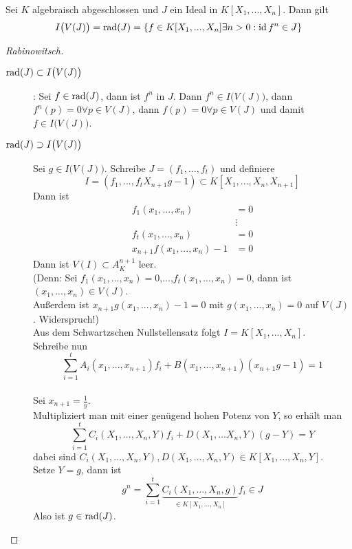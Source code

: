 	\begin{theorem}
		Sei $K$ algebraisch abgeschlossen und $J$ ein Ideal in $K[X_1,...,X_n]$. Dann gilt
		\[I\big(V(J)\big)=\operatorname{rad}(J)=\{f\in K[X_1,...,X_n]\exists n>0:\operatorname{id} f^n\in J\}\]
	\end{theorem}
	\begin{proof}[Rabinowitsch]
		\begin{description}
			\item[$\operatorname{rad}(J)\subset I\big(V(J)\big)$]: Sei $f\in \operatorname{rad}(J)$, dann ist $f^n$ in $J$. Dann $f^n\in I\big(V(J)\big)$, dann $f^n(p)=0\forall p\in V(J)$, dann $f(p)=0\forall p\in V(J)$ und damit $f\in I\big(V(J)\big)$.
			\item[$\operatorname{rad}(J)\supset I\big(V(J)\big)$] Sei $g\in I\big(V(J)\big)$. Schreibe $J=(f_1,...,f_t)$ und definiere
			\[I=(f_1,...,f_tX_{n+1}g-1)\subset K[X_1,...,X_n,X_{n+1}]\]
			Dann ist
			\begin{align*}
			f_1(x_1,...,x_n)&=0\\
			&\vdots\\
			f_t(x_1,...,x_n)&=0\\
			x_{n+1}f(x_1,...,x_n)-1&=0
			\end{align*}
			Dann ist $V(I)\subset A_K^{n+1}$ leer.\\
			(Denn: Sei $f_1(x_1,...,x_n)=0$,...,$f_t(x_1,...,x_n)=0$, dann ist $(x_1,...,x_n)\in V(J)$.\\
			Außerdem ist $x_{n+1}g(x_1,...,x_n)-1=0$ mit $g(x_1,...,x_n)=0$ auf $V(J)$. Widerspruch!)\\
			Aus dem Schwartzschen Nullstellensatz folgt $I=K[X_1,...,X_n]$.\\
			Schreibe nun 
			\[\sum_{i=1}^{t}A_i(x_1,...,x_{n+1})f_i+B(x_1,...,x_{n+1})(x_{n+1}g-1)=1\]\\
			Sei $x_{n+1}=\frac{1}{y}$.\\
			Multipliziert man mit einer genügend hohen Potenz von $Y$, so erhält man
			\[\sum_{i=1}^tC_i(X_1,...,X_n,Y)f_i+D(X_1,...X_n,Y)(g-Y)=Y\]
			dabei sind $C_i(X_1,...,X_n,Y),D(X_1,...,X_n,Y)\in K[X_1,...,X_n,Y]$.\\
			Setze $Y=g$, dann ist
			\[g^n=\sum_{i=1}^{t}\underbrace{C_i(X_1,...,X_n,g)}_{\in K[X_1,...,X_n]}f_i\in J\]
			Also ist $g\in\operatorname{rad}(J)$.
		\end{description}
	\end{proof}
